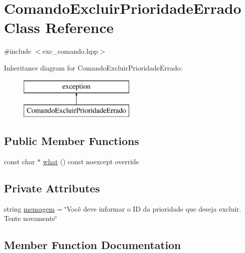 \hypertarget{classComandoExcluirPrioridadeErrado}{}\section{Comando\+Excluir\+Prioridade\+Errado Class Reference}
\label{classComandoExcluirPrioridadeErrado}


{\ttfamily \#include $<$exc\+\_\+comando.\+hpp$>$}

Inheritance diagram for Comando\+Excluir\+Prioridade\+Errado\+:\begin{figure}[H]
\begin{center}
\leavevmode
\includegraphics[height=2.000000cm]{classComandoExcluirPrioridadeErrado}
\end{center}
\end{figure}
\subsection*{Public Member Functions}
\begin{DoxyCompactItemize}
\item 
const char $\ast$ \hyperlink{classComandoExcluirPrioridadeErrado_a5cc6287358facad8209efc7c47eff853}{what} () const noexcept override
\end{DoxyCompactItemize}
\subsection*{Private Attributes}
\begin{DoxyCompactItemize}
\item 
string \hyperlink{classComandoExcluirPrioridadeErrado_a669931642bcb3157f9cdfc05bedff377}{mensagem} = \char`\"{}Você deve informar o ID da prioridade que deseja excluir. Tente novamente\char`\"{}
\end{DoxyCompactItemize}


\subsection{Member Function Documentation}
\mbox{\label{classComandoExcluirPrioridadeErrado_a5cc6287358facad8209efc7c47eff853}} 
